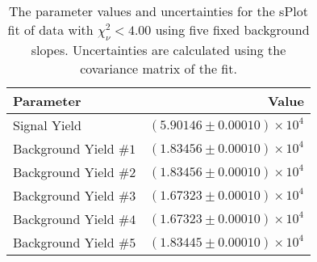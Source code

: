 
\begin{table}[ht]
    \begin{center}
        \begin{tabular}{lr}\toprule
            Parameter & Value \\\midrule
            Signal Yield & $(5.90146 \pm 0.00010) \times 10^{4}$ \\
            Background Yield $\#1$ & $(1.83456 \pm 0.00010) \times 10^{4}$ \\
            Background Yield $\#2$ & $(1.83456 \pm 0.00010) \times 10^{4}$ \\
            Background Yield $\#3$ & $(1.67323 \pm 0.00010) \times 10^{4}$ \\
            Background Yield $\#4$ & $(1.67323 \pm 0.00010) \times 10^{4}$ \\
            Background Yield $\#5$ & $(1.83445 \pm 0.00010) \times 10^{4}$ \\\bottomrule
        \end{tabular}
        \caption{The parameter values and uncertainties for the sPlot fit of data with $\chi^2_\nu < 4.00$ using five fixed background slopes. Uncertainties are calculated using the covariance matrix of the fit.}\label{tab:splot-fit-results-chisqdof-4.00-fixed-5}
    \end{center}
\end{table}
